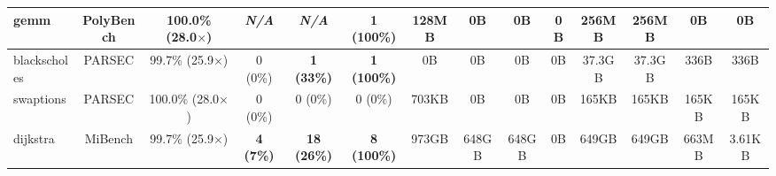 {\begin{tabular}{|l|c|c||c|c||c||c|c|c|c||c|c|c|c|}
\hline
gemm     & PolyBench  & 100.0\% (28.0$\times$) & \textit{N/A} & \textit{N/A} & \textbf{1 (100\%)} &
         128MB & 0B & 0B & 0B & 256MB & 256MB & 0B & 0B \\ %
\hline
blackscholes & PARSEC & 99.7\% (25.9$\times$) & 0 (0\%) & \textbf{1 (33\%)} & \textbf{1 (100\%)} &
             0B & 0B & 0B & 0B & 37.3GB & 37.3GB & 336B & 336B \\ %
\hline
swaptions & PARSEC & 100.0\% (28.0$\times$)  & 0 (0\%) & 0 (0\%) & 0 (0\%) &
          703KB & 0B & 0B & 0B & 165KB & 165KB & 165KB & 165KB \\ %
\hline
dijkstra & MiBench  & 99.7\% (25.9$\times$) & \textbf{4 (7\%)} & \textbf{18 (26\%)} & \textbf{8 (100\%)} &
         973GB & 648GB & 648GB & 0B & 649GB & 649GB & 663MB & 3.61KB \\ %
\hline
\end{tabular}
}
